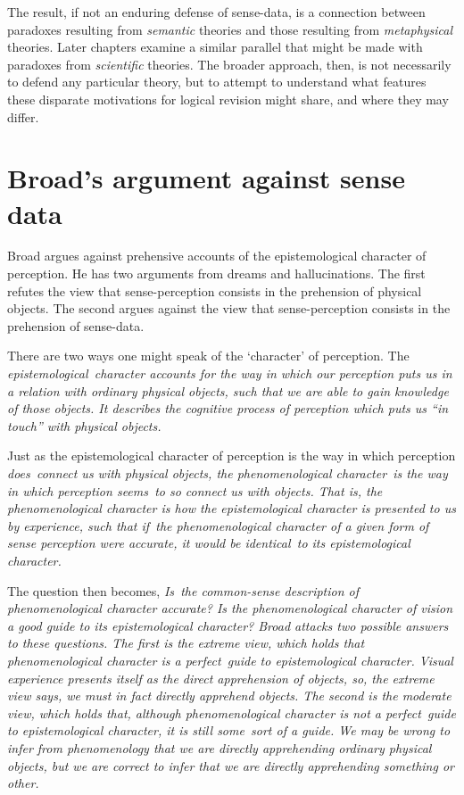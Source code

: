 The result, if not an enduring defense of sense-data, is a connection between paradoxes resulting from \emph{semantic} theories and those resulting from \emph{metaphysical} theories. Later chapters examine a similar parallel that might be made with paradoxes from \emph{scientific} theories. The broader approach, then, is not necessarily to defend any particular theory, but to attempt to understand what features these disparate motivations for logical revision might share, and where they may differ.  

\section{Broad's argument against sense data}\label{broad}
Broad argues against prehensive accounts of the epistemological character of perception. He has two arguments from dreams and hallucinations. The first refutes the view that sense-perception consists in the prehension of physical objects. The second argues against the view that sense-perception consists in the prehension of sense-data. 

There are two ways one might speak of the `character' of perception. The \em epistemological\em\ character accounts for the way in which our perception puts us in a relation with ordinary physical objects, such that we are able to gain knowledge of those objects. It describes the cognitive process of perception which puts us ``in touch'' with physical objects. 

Just as the epistemological character of perception is the way in which perception \em does\em\ connect us with physical objects, the \em phenomenological character\em\ is the way in which perception \em seems\em\ to so connect us with objects. That is, the phenomenological character is how the epistemological character is presented to us by experience, such that \em if\em\ the phenomenological character of a given form of sense perception were accurate, it would be \em identical\em\ to its epistemological character.

The question then becomes, \em Is\em\ the common-sense description of phenomenological character accurate? Is the phenomenological character of vision a good guide to its epistemological character? Broad attacks two possible answers to these questions. The first is the \em extreme view\em, which holds that phenomenological character is a \em perfect\em\ guide to epistemological character. Visual experience presents itself as the direct apprehension of objects, so, the extreme view says, we must in fact directly apprehend objects. The second is the \em moderate view\em, which holds that, although phenomenological character is not a \em perfect\em\ guide to epistemological character, it is still \em some\em\ sort of a guide. We may be wrong to infer from phenomenology that we are directly apprehending ordinary physical objects, but we are correct to infer that we are directly apprehending \em something or other\em.

